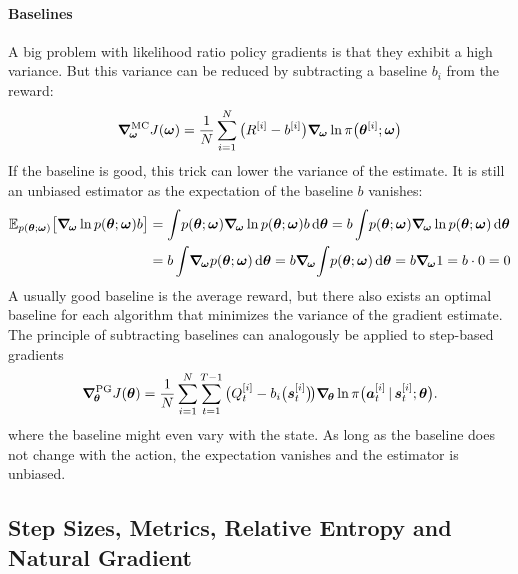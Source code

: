 				\paragraph{Baselines}
					A big problem with likelihood ratio policy gradients is that they exhibit a high variance. But this variance can be reduced by subtracting a baseline \(b_i\) from the reward:
					\begin{equation}
						\grad_{\!\bm{\omega}}^\mathrm{MC} J(\bm{\omega})
						= \frac{1}{N} \sum_{i = 1}^{N} \big(R^{[i]} - b^{[i]}\big) \grad_{\!\bm{\omega}} \ln \pi\big(\bm{\theta}^{[i]}; \bm{\omega}\big)  \label{eq:policyGradientWithBaseline}
					\end{equation}
					If the baseline is good, this trick can lower the variance of the estimate. It is still an unbiased estimator as the expectation of the baseline \(b\) vanishes:
					\begin{align*}
						\E_{p(\vec{\theta}; \vec{\omega})}\big[ \grad_{\!\vec{\omega}} \ln p(\vec{\theta}; \vec{\omega}) b \big]
						 & = \int\! p(\vec{\theta}; \vec{\omega}) \grad_{\!\vec{\omega}} \ln p(\vec{\theta}; \vec{\omega}) b \dd{\vec{\theta}}
						= b \int\! p(\vec{\theta}; \vec{\omega}) \grad_{\!\vec{\omega}} \ln p(\vec{\theta}; \vec{\omega}) \dd{\vec{\theta}}    \\
						 & = b \int\! \grad_{\!\vec{\omega}} p(\vec{\theta}; \vec{\omega}) \dd{\vec{\theta}}
						= b \grad_{\!\vec{\omega}} \!\int\!  p(\vec{\theta}; \vec{\omega}) \dd{\vec{\theta}}
						= b \grad_{\!\vec{\omega}} 1
						= b \cdot 0
						= 0
					\end{align*}
					A usually good baseline is the average reward, but there also exists an optimal baseline for each algorithm that minimizes the variance of the gradient estimate. The principle of subtracting baselines can analogously be applied to step-based gradients
					\begin{equation*}
						\grad_{\!\bm{\theta}}^\mathrm{PG} J(\bm{\theta})
						= \frac{1}{N} \sum_{i = 1}^{N} \sum_{t = 1}^{T - 1} \big( Q_t^{[i]} - b_i\big(\bm{s}_t^{[i]}\big) \!\big) \grad_{\!\bm{\theta}} \ln \pi\big(\bm{a}_t^{[i]} \,\vert\, \bm{s}_t^{[i]}; \bm{\theta}\big).
					\end{equation*}
					where the baseline might even vary with the state. As long as the baseline does not change with the action, the expectation vanishes and the estimator is unbiased.

		\subsection{Step Sizes, Metrics, Relative Entropy and Natural Gradient} %
			\label{subsec:policySearchMetrics}

